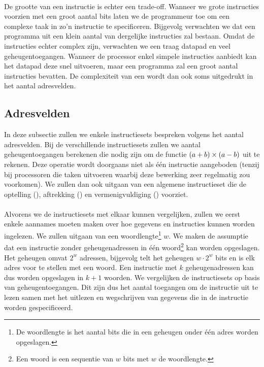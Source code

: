 \paragraph{}
De grootte van een instructie is echter een trade-off. Wanneer we grote instructies voorzien met een groot aantal bits laten we de programmeur toe om een complexe taak in zo'n instructie te specificeren. Bijgevolg verwachten we dat een programma uit een klein aantal van dergelijke instructies zal bestaan. Omdat de instructies echter complex zijn, verwachten we een traag datapad en veel geheugentoegangen. Wanneer de processor enkel simpele instructies aanbiedt kan het datapad deze snel uitvoeren, maar een programma zal een groot aantal instructies bevatten. De complexiteit van een  wordt dan ook soms uitgedrukt in het aantal adresvelden.
\subsection{Adresvelden}
In deze subsectie zullen we enkele instructiesets bespreken volgens het aantal adresvelden. Bij de verschillende instructiesets zullen we aantal geheugentoegangen berekenen die nodig zijn om de functie $\left( a+b \right)\times\left( a-b \right)$ uit te rekenen. Deze operatie wordt doorgaans niet als \'e\'en instructie aangeboden (tenzij bij processoren die taken uitvoeren waarbij deze bewerking zeer regelmatig zou voorkomen). We zullen dan ook uitgaan van een algemene instructieset die de optelling (), aftrekking () en vermenigvuldiging () voorziet.
\paragraph{}
Alvorens we de instructiesets met elkaar kunnen vergelijken, zullen we eerst enkele aannames moeten maken over hoe gegevens en instructies kunnen worden ingelezen. We zullen uitgaan van een woordlengte\footnote{De woordlengte is het aantal bits die in een geheugen onder \'e\'en adres worden opgeslagen.} $w$. We maken de assumptie dat een instructie zonder geheugenadressen in \'e\'en woord\footnote{Een woord is een sequentie van $w$ bits met $w$ de woordlengte.} kan worden opgeslagen. Het geheugen omvat $2^w$ adressen, bijgevolg telt het geheugen $w\cdot 2^w$ bits en is elk adres voor te stellen met een woord. Een instructie met $k$ geheugenadressen kan dus worden opgeslagen in $k+1$ woorden. We vergelijken de instructiesets op basis van geheugentoegangen. Dit zijn dus het aantal toegangen om de instructie uit te lezen samen met het uitlezen en wegschrijven van gegevens die in de instructie worden gespecificeerd.
